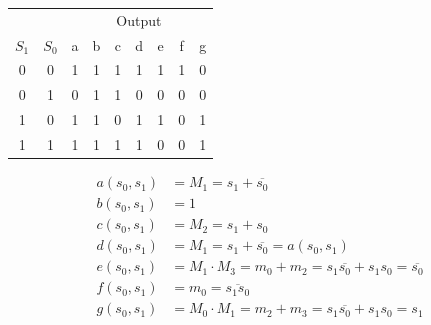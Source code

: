 \documentclass[12pt,openany]{book}
\begin{document}
					\begin{minipage}[htp]{0.45\textwidth} %
					\centering
					\begin{tabular}{|c|c|c|c|c|c|c|c|c|}
					\hline
					\multicolumn{2}{|c|}{} & \multicolumn{7}{c|}{Output} \\
					\hhline{|~|-|-------|}
					\( S_1 \) & \( S_0 \) & a & b & c & d & e & f & g \\
					\hline
					0         & 0         & 1 & 1 & 1 & 1 & 1 & 1 & 0 \\
					\hline
					0         & 1         & 0 & 1 & 1 & 0 & 0 & 0 & 0 \\
					\hline
					1         & 0         & 1 & 1 & 0 & 1 & 1 & 0 & 1 \\
					\hline
					1         & 1         & 1 & 1 & 1 & 1 & 0 & 0 & 1 \\
					\hline
					\end{tabular}
					\end{minipage}
					\hfill
					\vline
					\hfill
					\begin{minipage}[htp]{0.45\textwidth}

\begin{center}
						\begin{align*}
						a(s_0, s_1) & = M_1 = s_1 + \overline{s_0}                                               \\
						b(s_0, s_1) & = 1                                                                        \\
						c(s_0, s_1) & = M_2 = s_1 + s_0                                                          \\
						d(s_0, s_1) & = M_1 = s_1 + \overline{s_0} = a(s_0, s_1)                                 \\
						e(s_0, s_1) & = M_1 \cdot M_3 = m_0 + m_2 = s_1 \overline{s_0} + s_1s_0 = \overline{s_0} \\
						f(s_0, s_1) & = m_0 = \overline{s_1 s_0}                                                 \\
						g(s_0, s_1) & = M_0 \cdot M_1 = m_2 + m_3 = s_1 \overline{s_0} + s_1s_0 = s_1            
						\end{align*}
\end{center}
					\end{minipage}

			      	\newpage
\end{document}
